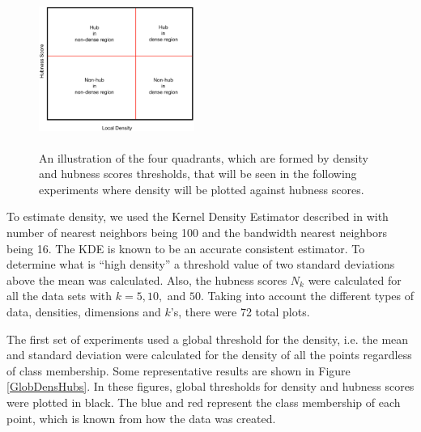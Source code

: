 \documentclass[graybox]{svmult}
\begin{document}
\begin{figure}
\centering
\includegraphics[width=2in,height=2in]{../fig/DensHub-Intuition.png}
\caption{An illustration of the four quadrants, which are formed by density and hubness scores thresholds, that will be seen in the following experiments where density will be plotted against hubness scores.}\label{fig:DensHubInt}
\end{figure}

To estimate density, we used the Kernel Density Estimator described in \cite{berry2016variable} with number of nearest neighbors being 100 and the bandwidth nearest neighbors being 16. The KDE is known to be an accurate consistent estimator. To determine what is ``high density'' a threshold value of two standard deviations above the mean was calculated. Also, the hubness scores $N_k$ were calculated for all the data sets with $k=5,10,$ and $50$. Taking into account the different types of data, densities, dimensions and $k$'s, there were 72 total plots.

The first set of experiments used a global threshold for the density, i.e. the mean and standard deviation were calculated for the density of all the points regardless of class membership. Some representative results are shown in Figure  \ref{GlobDensHubs}. In these figures, global thresholds for density and hubness scores were plotted in black. The blue and red represent the class membership of each point, which is known from how the data was created. 
\end{document}
